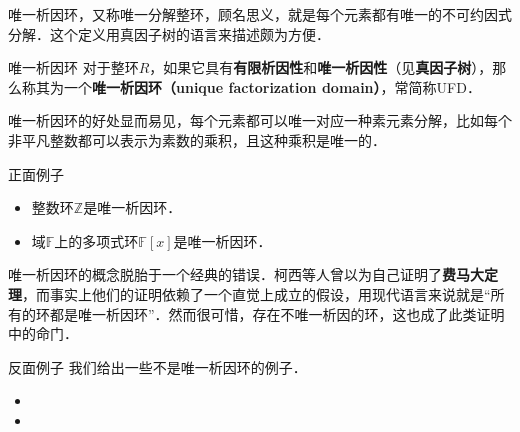


唯一析因环，又称唯一分解整环，顾名思义，就是每个元素都有唯一的不可约因式分解．这个定义用真因子树的语言来描述颇为方便．

\begin{definition}{唯一析因环}
对于整环$R$，如果它具有\textbf{有限析因性}和\textbf{唯一析因性}（见\textbf{真因子树}），那么称其为一个\textbf{唯一析因环（unique factorization domain）}，常简称UFD．
\end{definition}

唯一析因环的好处显而易见，每个元素都可以唯一对应一种素元素分解，比如每个非平凡整数都可以表示为素数的乘积，且这种乘积是唯一的．

\begin{example}{正面例子}
\begin{itemize}
\item 整数环$\mathbb{Z}$是唯一析因环．
\item 域$\mathbb{F}$上的多项式环$\mathbb{F}[x]$是唯一析因环．
\end{itemize}
\end{example}

唯一析因环的概念脱胎于一个经典的错误．柯西等人曾以为自己证明了\textbf{费马大定理}，而事实上他们的证明依赖了一个直觉上成立的假设，用现代语言来说就是“所有的环都是唯一析因环”．然而很可惜，存在不唯一析因的环，这也成了此类证明中的命门．

\begin{example}{反面例子}
我们给出一些不是唯一析因环的例子．
\begin{itemize}
\item 
\item 
\end{itemize}
\end{example}


